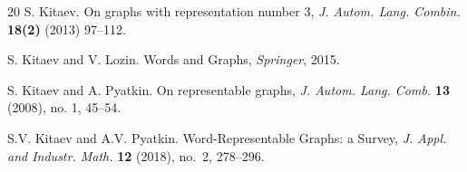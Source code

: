\documentclass[11pt]{article}
\begin{document}
\begin{thebibliography}{20}
 S. Kitaev. On graphs with representation number 3, {\em J. Autom. Lang. Combin.} {\bf 18(2)} (2013) 97--112.
	
 S. Kitaev and V. Lozin. Words and Graphs, {\em Springer}, 2015.

 S. Kitaev and A. Pyatkin. On representable graphs,  {\em J. Autom. Lang. Comb.} {\bf 13} (2008), no. 1, 45--54.

 S.V. Kitaev and A.V. Pyatkin.  Word-Representable Graphs: a Survey, {\em J. Appl. and Industr. Math.} {\bf 12} (2018), no.~2, 278--296. 

 

		
	\end{thebibliography}
\end{document}
